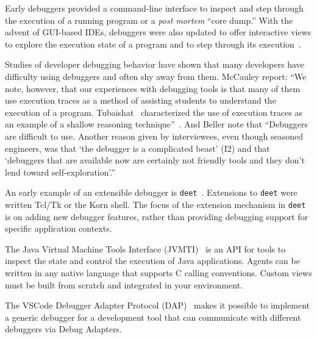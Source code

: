 \documentclass[sigplan,10pt]{acmart}
\newcommand\deet{{\tt deet}\xspace}
\begin{document}

Early debuggers provided a command-line interface to inspect and step through the execution of a running program or a \emph{post mortem} ``core dump.''
With the advent of GUI-based IDEs, debuggers were also updated to offer interactive views to explore the execution state of a program and to step through its execution~\cite{Rose96a}.

Studies of developer debugging behavior have shown that many developers have difficulty using debuggers and often shy away from them.
McCauley \etal report:
``We note, however, that our experiences with debugging tools is that many of them use execution traces as a method of assisting students to understand the execution of a program.
Tubaishat~\cite{Tuba01a} characterized the use of execution traces as an example of a shallow reasoning technique''~\cite{McCa08a}.
And Beller \etal note that
``Debuggers are difficult to use.
Another reason given by interviewees, even though seasoned engineers, was that `the debugger is a complicated beast' (I2) and that `debuggers that are available now are certainly not friendly tools and they don't lend toward self-exploration'.''
\cite{Bell18a}

An early example of an extensible debugger is \deet~\cite{Hans97a}.
Extensions to \deet were written Tcl/Tk or the Korn shell.
The focus of the extension mechanism in \deet is on adding new debugger features, rather than providing debugging support for specific application contexts.

The Java Virtual Machine Tools Interface (JVMTI)~\cite{JVMTI24} is an API for tools to inspect the state and control the execution of Java applications.
Agents can be written in any native language that supports C calling conventions.
Custom views must be built from scratch and integrated in your environment.

The VSCode Debugger Adapter Protocol (DAP)~\cite{DAP21} makes it possible to implement a generic debugger for a development tool that can communicate with different debuggers via Debug Adapters.
\end{document}
